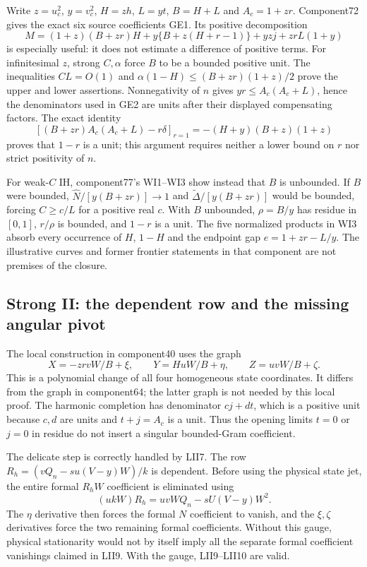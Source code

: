 Write $z=u_c^2$, $y=v_c^2$, $H=zh$, $L=yt$, $B=H+L$ and
$A_c=1+zr$. Component72 gives the exact six source coefficients GE1.
Its positive decomposition
\[
 M=(1+z)(B+zr)H+y\{B+z(H+r-1)\}+yzj+zrL(1+y)
\]
is especially useful: it does not estimate a difference of positive
terms. For infinitesimal $z$, strong $C,\alpha$ force $B$ to be a
bounded positive unit. The inequalities $CL=O(1)$ and
$\alpha(1-H)\le(B+zr)(1+z)/2$ prove the upper and lower assertions.
Nonnegativity of $n$ gives $yr\le A_c(A_c+L)$, hence the denominators
used in GE2 are units after their displayed compensating factors.
The exact identity
\[
 [(B+zr)A_c(A_c+L)-r\delta]_{r=1}
 =-(H+y)(B+z)(1+z)
\]
proves that $1-r$ is a unit; this argument requires neither a lower
bound on $r$ nor strict positivity of $n$.

For weak-$C$ IH, component77's WI1--WI3 show instead that $B$ is
unbounded. If $B$ were bounded, $\widehat N/[y(B+zr)]\to1$ and
$\widetilde\Delta/[y(B+zr)]$ would be bounded, forcing $C\ge c/L$
for a positive real $c$. With $B$ unbounded, $\rho=B/y$ has residue in
$[0,1]$, $r/\rho$ is bounded, and $1-r$ is a unit. The five normalized
products in WI3 absorb every occurrence of $H$, $1-H$ and the endpoint
gap $e=1+zr-L/y$. The illustrative curves and former frontier statements
in that component are not premises of the closure.

\subsection{Strong II: the dependent row and the missing angular pivot}

The local construction in component40 uses the graph
\[
 X=-zr vW/B+\xi,\qquad Y=HuW/B+\eta,\qquad Z=uvW/B+\zeta.
\]
This is a polynomial change of all four homogeneous state coordinates.
It differs from the graph in component64; the latter graph is not
needed by this local proof. The harmonic completion has denominator
$cj+dt$, which is a positive unit because $c,d$ are units and
$t+j=A_c$ is a unit. Thus the opening limits $t=0$ or $j=0$ in residue
do not insert a singular bounded-Gram coefficient.

The delicate step is correctly handled by LII7. The row
$R_h=(vQ_n-su(V-y)W)/k$ is dependent. Before using the physical state
jet, the entire formal $R_hW$ coefficient is eliminated using
\[
 (ukW)R_h=uvWQ_n-sU(V-y)W^2.
\]
The $\eta$ derivative then forces the formal $N$ coefficient to vanish,
and the $\xi,\zeta$ derivatives force the two remaining formal
coefficients. Without this gauge, physical stationarity would not by
itself imply all the separate formal coefficient vanishings claimed in
LII9. With the gauge, LII9--LII10 are valid.


